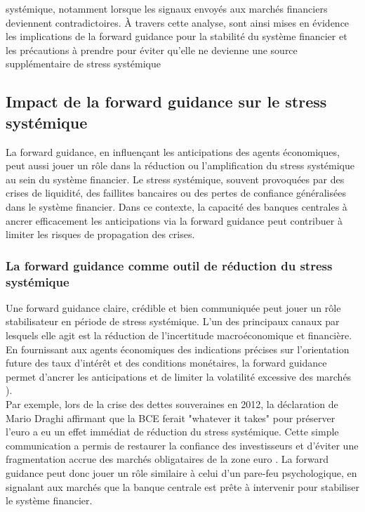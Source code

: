 systémique, notamment lorsque les signaux envoyés aux marchés financiers deviennent contradictoires. À travers cette analyse, sont ainsi mises en évidence les implications de la forward guidance pour la stabilité du système financier et les précautions à prendre pour éviter qu’elle ne devienne une source supplémentaire de stress systémique

\subsection{Impact de la forward guidance sur le stress systémique}

La forward guidance, en influençant les anticipations des agents économiques, peut aussi jouer un rôle dans la réduction ou l’amplification du stress systémique au sein du système financier. Le stress systémique, souvent provoquées par des crises de liquidité, des faillites bancaires ou des pertes de confiance généralisées dans le système financier. Dans ce contexte, la capacité des banques centrales à ancrer efficacement les anticipations via la forward guidance peut contribuer à limiter les risques de propagation des crises.

\subsubsection{La forward guidance comme outil de réduction du stress systémique}

Une forward guidance claire, crédible et bien communiquée peut jouer un rôle stabilisateur en période de stress systémique. L’un des principaux canaux par lesquels elle agit est la réduction de l’incertitude macroéconomique et financière. En fournissant aux agents économiques des indications précises sur l’orientation future des taux d’intérêt et des conditions monétaires, la forward guidance permet d’ancrer les anticipations et de limiter la volatilité excessive des marchés \citep{woodford2012}).\\

Par exemple, lors de la crise des dettes souveraines en 2012, la déclaration de Mario Draghi affirmant que la BCE ferait "whatever it takes" pour préserver l’euro a eu un effet immédiat de réduction du stress systémique. Cette simple communication a permis de restaurer la confiance des investisseurs et d'éviter une fragmentation accrue des marchés obligataires de la zone euro \citep{Acharya2015}. La forward guidance peut donc jouer un rôle similaire à celui d’un pare-feu psychologique, en signalant aux marchés que la banque centrale est prête à intervenir pour stabiliser le système financier.\\

